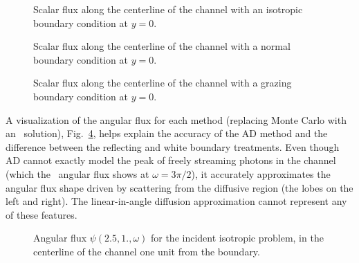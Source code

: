 \begin{figure}[htb]
  \centering\small
  \hspace{-.5in}
  
  \hspace{-.5in}
  \caption{Scalar flux along the centerline of the channel with an isotropic
  boundary condition at $y=0$.}
  \label{fig:bcChannelIsotropic}
\end{figure}

\begin{figure}[htb]
  \centering\small
  \hspace{-.5in}
  
  \hspace{-.5in}
  \caption{Scalar flux along the centerline of the channel with a normal
  boundary condition at $y=0$.}
  \label{fig:bcChannelDelta}
\end{figure}

\begin{figure}[htb]
  \centering\small
  \hspace{-.5in}
  
  \hspace{-.5in}
  \caption{Scalar flux along the centerline of the channel with a grazing
  boundary condition at $y=0$.}
  \label{fig:bcChannelGrazing}
\end{figure}

A visualization of the angular flux for each method (replacing Monte Carlo with
an \SN\ solution), Fig.~\ref{fig:bcChannelIsotropicAngular}, helps explain the
accuracy
of the AD method and the difference between the reflecting and white boundary
treatments. Even though AD cannot exactly model the peak of freely streaming
photons in the channel (which the \SN\ angular flux shows at $\omega=3\pi/2$),
it accurately approximates the angular flux shape driven by scattering from the
diffusive region (the lobes on the left and right).
The linear-in-angle diffusion approximation cannot represent any of these
features.  

\begin{figure}[htb!]
  \centering\small
  \vspace{-.25in}
  \hspace{-.5in}
  
  \hspace{-.5in}
  \vspace{-.25in}
  \caption{Angular flux $\psi(2.5, 1., \omega)$ for the incident isotropic
  problem, in the centerline of the channel one unit from the boundary.}
  \label{fig:bcChannelIsotropicAngular}
\end{figure}


